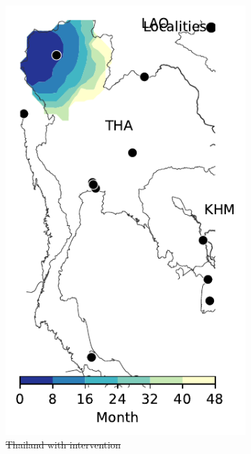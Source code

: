 \documentclass[11pt]{article}
\theoremstyle{definition}
\providecommand{\DIFdeltex}[1]{{\protect\color{red}\sout{#1}}}                      %
\providecommand{\DIFdelFL}[1]{\DIFdel{#1}} %
\providecommand{\DIFaddbeginFL}{} %
\providecommand{\DIFaddendFL}{} %
\providecommand{\DIFdelbeginFL}{} %
\providecommand{\DIFdelendFL}{} %
\providecommand{\DIFdel}[1]{\texorpdfstring{\DIFdeltex{#1}}{}} %
\newcommand{\DIFscaledelfig}{0.5}
\newlength{\DIFdelgraphicswidth} %
\newlength{\DIFdelgraphicsheight} %
\newcommand{\DIFaddincludegraphics}[2][]{{\color{blue}\fbox{\DIFOincludegraphics[#1]{#2}}}} %
\newcommand{\DIFdelincludegraphics}[2][]{%
\sbox{\DIFdelgraphicsbox}{\DIFOincludegraphics[#1]{#2}}%
\settoboxwidth{\DIFdelgraphicswidth}{\DIFdelgraphicsbox} %
\settoboxtotalheight{\DIFdelgraphicsheight}{\DIFdelgraphicsbox} %
\scalebox{\DIFscaledelfig}{%
\parbox[b]{\DIFdelgraphicswidth}{\usebox{\DIFdelgraphicsbox}\\[-\baselineskip] \rule{\DIFdelgraphicswidth}{0em}}\llap{\resizebox{\DIFdelgraphicswidth}{\DIFdelgraphicsheight}{%
\setlength{\unitlength}{\DIFdelgraphicswidth}%
\begin{picture}(1,1)%
\thicklines\linethickness{2pt} %
{\color[rgb]{1,0,0}\put(0,0){\framebox(1,1){}}}%
{\color[rgb]{1,0,0}\put(0,0){\line( 1,1){1}}}%
{\color[rgb]{1,0,0}\put(0,1){\line(1,-1){1}}}%
\end{picture}%
}\hspace*{3pt}}} %
} %
\DeclareRobustCommand{\DIFaddbeginFL}{\DIFOaddbeginFL \let\includegraphics\DIFaddincludegraphics} %
\DeclareRobustCommand{\DIFaddendFL}{\DIFOaddendFL \let\includegraphics\DIFOincludegraphics} %
\DeclareRobustCommand{\DIFdelbeginFL}{\DIFOdelbeginFL \let\includegraphics\DIFdelincludegraphics} %
\DeclareRobustCommand{\DIFdelendFL}{\DIFOaddendFL \let\includegraphics\DIFOincludegraphics} %
\begin{document}
\begin{figure}[ht]
\begin{subfigure}[b]{.135\textwidth}
    \DIFaddendFL \includegraphics[width=\textwidth]{../../cellular_automata/results/contour/TH_model-B_precip1-out-100_m1_l3.pdf}
\caption{\DIFdelbeginFL \DIFdelFL{Thailand with intervention}\DIFdelendFL \label{fig:thlBContourInt}} %
\end{subfigure}
\DIFdelbeginFL %
\DIFdelendFL \DIFaddbeginFL \begin{subfigure}[b]{.3\textwidth}

\end{subfigure}
\end{figure}
\end{document}
